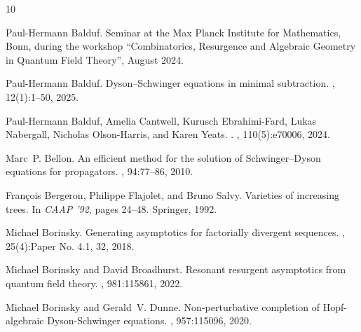 \documentclass[oneside]{amsart}
\theoremstyle{definition}
\begin{document}
%

%
%
%
%
%
%

%

%
%

%
%
%
%
%
%
%
%

%

%

%

%

%

%
%
%
%
%
%
%
%
%
%
%
%
%
%
%
%
%
%
%
%
%
%
%
%
%
%
%
%
%
%
%
%
%
%
%
%
%
%
%
%

%

%

%
%
%
%
%
%
%
%
%
%
%
%
%
%
%
%
%
%
%
%
%
%
%
%
%
%
%

\begin{thebibliography}{10}

Paul-Hermann Balduf.
\newblock Seminar at the Max Planck Institute for Mathematics, Bonn, during the
  workshop ``Combinatorics, Resurgence and Algebraic Geometry in Quantum Field
  Theory'', August 2024.

Paul-Hermann Balduf.
\newblock Dyson–{S}chwinger equations in minimal subtraction.
, 12(1):1--50,
  2025.

Paul-Hermann Balduf, Amelia Cantwell, Kurusch Ebrahimi-Fard, Lukas Nabergall,
  Nicholas Olson-Harris, and Karen Yeats.
.
, 110(5):e70006, 2024.

Marc~P. Bellon.
\newblock An efficient method for the solution of {S}chwinger–{D}yson
  equations for propagators.
, 94:77--86, 2010.

Fran\c{c}ois Bergeron, Philippe Flajolet, and Bruno Salvy.
\newblock Varieties of increasing trees.
\newblock In {\em {{CAAP}} '92}, pages 24--48. Springer, 1992.

Michael Borinsky.
\newblock Generating asymptotics for factorially divergent sequences.
, 25(4):Paper No. 4.1, 32, 2018.

Michael Borinsky and David Broadhurst.
\newblock Resonant resurgent asymptotics from quantum field theory.
, 981:115861, 2022.

Michael Borinsky and Gerald~V. Dunne.
\newblock Non-perturbative completion of {H}opf-algebraic {D}yson-{S}chwinger
  equations.
, 957:115096, 2020.


\end{thebibliography}
\end{document}
